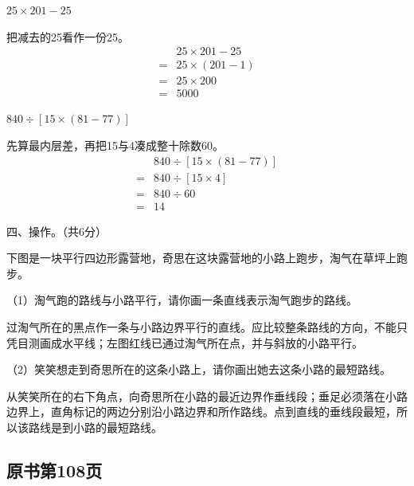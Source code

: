 \(25\times201-25\)\par
\begin{BookAnswer}
把减去的25看作一份25。\[\begin{aligned} &25\times201-25\\ ={}&25\times(201-1)\\ ={}&25\times200\\ ={}&5000\end{aligned}\]
\end{BookAnswer}

\(840\div[15\times(81-77)]\)\par
\begin{BookAnswer}
先算最内层差，再把15与4凑成整十除数60。\[\begin{aligned}&840\div[15\times(81-77)]\\={}&840\div[15\times4]\\={}&840\div60\\={}&14\end{aligned}\]
\end{BookAnswer}

四、操作。（共6分）\par 下图是一块平行四边形露营地，奇思在这块露营地的小路上跑步，淘气在草坪上跑步。\par （1）淘气跑的路线与小路平行，请你画一条直线表示淘气跑步的路线。\par
{}
\begin{BookAnswer}
过淘气所在的黑点作一条与小路边界平行的直线。应比较整条路线的方向，不能只凭目测画成水平线；左图红线已通过淘气所在点，并与斜放的小路平行。
\end{BookAnswer}

（2）笑笑想走到奇思所在的这条小路上，请你画出她去这条小路的最短路线。\par
{}
\begin{BookAnswer}
从笑笑所在的右下角点，向奇思所在小路的最近边界作垂线段；垂足必须落在小路边界上，直角标记的两边分别沿小路边界和所作路线。点到直线的垂线段最短，所以该路线是到小路的最短路线。
\end{BookAnswer}



\subsection*{原书第108页}

